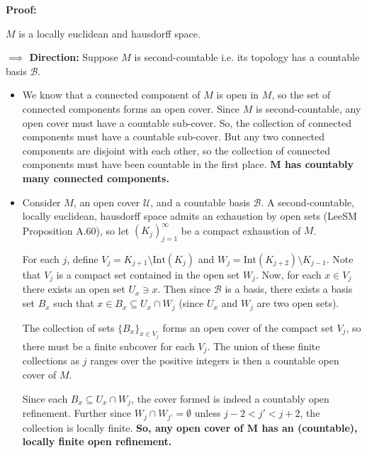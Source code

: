 \documentclass{article}
\begin{document}
\vskip 0.5cm
\textbf{Proof:}


\vskip 0.25cm

$M$ is a locally euclidean and hausdorff space.
\vskip 0.5cm

\textbf{$\implies$ Direction:} Suppose $M$ is second-countable i.e. its topology has a countable basis $\mathcal B$. 
\begin{itemize}
  \item We know that a connected component of $M$ is open in $M$, so the set of connected components forms an open cover. Since $M$ is second-countable, any open cover must have a countable sub-cover. So, the collection of connected components must have a countable sub-cover. But any two connected components are disjoint with each other, so the collection of connected components must have been countable in the first place. \textbf{$\mathbf{M}$ has countably many connected components.}
  
  \vskip 0.5cm
  \item Consider $M$, an open cover $\mathcal{U}$, and a countable basis $\mathcal{B}$. A second-countable, locally euclidean, hausdorff space admits an exhaustion by open sets (LeeSM Proposition A.60), so let $(K_j)_{j = 1}^{\infty}$ be a compact exhaustion of $M$.
  
  \vskip 0.25cm
  For each $j$, define $V_j = K_{j+1} \setminus \text{Int}(K_j)$ and $W_j = \text{Int}(K_{j+2}) \setminus K_{j - 1}$. Note that $V_j$ is a compact set contained in the open set $W_j$. Now, for each $x \in V_j$ there exists an open set $U_x \ni x$. Then since $\mathcal{B}$ is a basis, there exists a basis set $B_x$ such that $x \in B_x \subseteq U_x \cap W_j$ (since $U_x$ and $W_j$ are two open sets).

  \vskip 0.25cm
  The collection of sets $\{B_x\}_{x \in V_j}$ forms an open cover of the compact set $V_j$, so there must be a finite subcover for each $V_j$. The union of these finite collections as $j$ ranges over the positive integers is then a countable open cover of $M$. 
  
  \vskip 0.25cm
  Since each $B_x \subseteq U_x \cap W_j$, the cover formed is indeed a countably open refinement. Further since $W_j \cap W_{j'} = \emptyset$ unless $j - 2 < j' < j + 2$, the collection is locally finite. \textbf{So, any open cover of $\mathbf{M}$ has an (countable), locally finite open refinement.}
\end{itemize}
\end{document}
